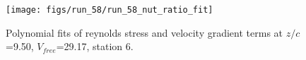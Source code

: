 \begin{figure}[H]
\centering
\texttt{[image: figs/run\_58/run\_58\_nut\_ratio\_fit]}
\caption{Polynomial fits of reynolds stress and velocity gradient terms at $z/c$=9.50, $V_{free}$=29.17, station 6.}
\label{fig:run_58_nut_ratio_fit}
\end{figure}


